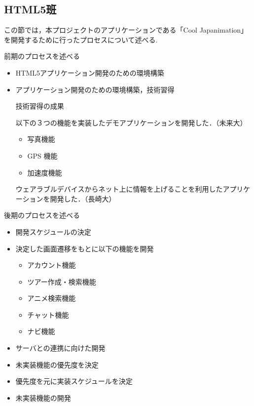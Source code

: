 \subsection{HTML5班}
\par この節では，本プロジェクトのアプリケーションである「Cool Japanimation」を開発するために行ったプロセスについて述べる.

\par 前期のプロセスを述べる

\begin{itemize}
\item HTML5アプリケーション開発のための環境構築
\item アプリケーション開発のための環境構築，技術習得

\par 技術習得の成果

\par 以下の３つの機能を実装したデモアプリケーションを開発した．（未来大）
\begin{itemize}
\item 写真機能
\item GPS 機能
\item 加速度機能
\end{itemize}

\par ウェアラブルデバイスからネット上に情報を上げることを利用したアプリケーションを開発した．（長崎大）
\end{itemize}
\par
\par 後期のプロセスを述べる
\begin{itemize}
\item 開発スケジュールの決定
\item 決定した画面遷移をもとに以下の機能を開発
\begin{itemize}
\item アカウント機能
\item ツアー作成・検索機能
\item アニメ検索機能
\item チャット機能
\item ナビ機能
\end{itemize}
\item サーバとの連携に向けた開発
\item 未実装機能の優先度を決定
\item 優先度を元に実装スケジュールを決定
\item 未実装機能の開発
\end{itemize}

